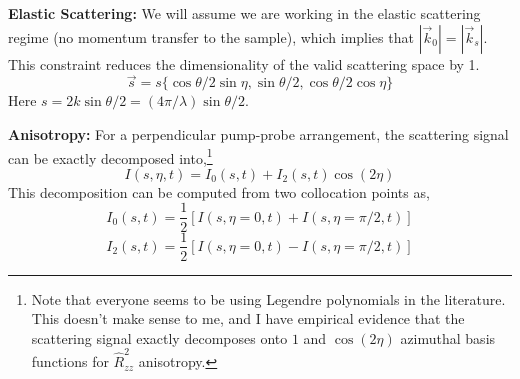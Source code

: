 \documentclass[fleqn,oneside,12pt]{article}
\begin{document}
\textbf{Elastic Scattering:} We will assume we are working in the elastic
scattering regime (no momentum transfer to the sample), which implies that
$|\vec k_0| = |\vec k_s|$. This constraint reduces the dimensionality of the
valid scattering space by 1.
\[
\vec s = 
s 
\{
\cos \theta / 2 \sin \eta,
\sin \theta / 2,
\cos \theta / 2 \cos \eta
\}
\]
Here $s = 2 k \sin \theta / 2 = (4 \pi / \lambda) \sin \theta / 2$.

\textbf{Anisotropy:} For a perpendicular pump-probe arrangement, the scattering
signal can be exactly decomposed into,\footnote{Note that everyone seems to be
using Legendre polynomials in the literature. This doesn't make sense to me, and
I have empirical evidence that the scattering signal exactly decomposes onto $1$
and $\cos (2 \eta)$ azimuthal basis functions for $\hat R_{zz}^2$ anisotropy.}
\[
I (s, \eta, t)
=
I_{0} (s, t)
+
I_{2} (s, t) \cos (2 \eta)
\]
This decomposition can be computed from two collocation points as,
\[
I_{0} (s, t)
=
\frac{1}{2}
\left [
I (s, \eta=0, t)
+
I (s, \eta=\pi/2, t)
\right ]
\]
\[
I_{2} (s, t)
=
\frac{1}{2}
\left [
I (s, \eta=0, t)
-
I (s, \eta=\pi/2, t)
\right ]
\]
\end{document}
